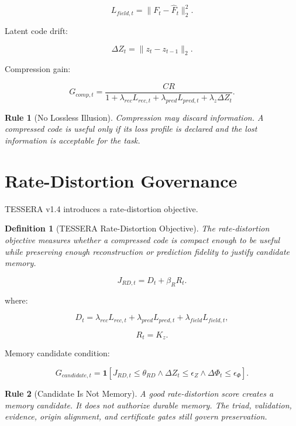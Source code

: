 \documentclass[12pt]{article}
\newtheorem{definition}{Definition}
\newtheorem{rulebox}{Rule}
\begin{document}
\[
L_{field,t}=\|F_t-\hat{F}_t\|_2^2.
\]

Latent code drift:

\[
\boxed{
\Delta Z_t=\|z_t-z_{t-1}\|_2.
}
\]

Compression gain:

\[
\boxed{
G_{comp,t}=\frac{CR}{1+\lambda_{rec}L_{rec,t}+\lambda_{pred}L_{pred,t}+\lambda_z\Delta Z_t}.
}
\]

\begin{rulebox}[No Lossless Illusion]
Compression may discard information. A compressed code is useful only if its
loss profile is declared and the lost information is acceptable for the task.
\end{rulebox}

\section{Rate-Distortion Governance}

TESSERA v1.4 introduces a rate-distortion objective.

\begin{definition}[TESSERA Rate-Distortion Objective]
The rate-distortion objective measures whether a compressed code is compact
enough to be useful while preserving enough reconstruction or prediction
fidelity to justify candidate memory.
\end{definition}

\[
\boxed{
J_{RD,t}
=
D_t+\beta_R R_t.
}
\]

where:

\[
D_t=\lambda_{rec}L_{rec,t}+\lambda_{pred}L_{pred,t}+\lambda_{field}L_{field,t},
\]

\[
R_t=K_z.
\]

Memory candidate condition:

\[
\boxed{
G_{candidate,t}=\mathbf{1}
\left[
J_{RD,t}\leq\theta_{RD}
\wedge
\Delta Z_t\leq\epsilon_Z
\wedge
\Delta\Phi_t\leq\epsilon_{\Phi}
\right].
}
\]

\begin{rulebox}[Candidate Is Not Memory]
A good rate-distortion score creates a memory candidate. It does not authorize
durable memory. The triad, validation, evidence, origin alignment, and
certificate gates still govern preservation.
\end{rulebox}

\end{document}
